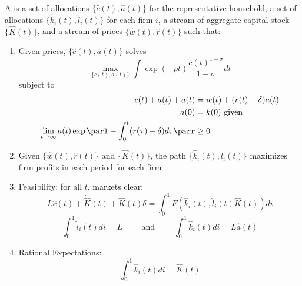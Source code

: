 \documentclass[10pt]{article}
\begin{document}
\begin{model}
	\begin{definition}
		A  is a set of allocations $\{\hat{c}(t),\hat{a}(t)\}$ for the representative household, a set of allocations $\{\hat{k}_i(t),\hat{l}_i(t)\}$ for each firm $i$, a stream of aggregate capital stock $\{\hat{K}(t)\}$, and a stream of prices $\{\hat{w}(t), \hat{r}(t)\}$ such that:
		\begin{enumerate}
			\item Given prices, $\{\hat{c}(t),\hat{a}(t)\}$ solves \[\max_{\{c(t),a(t)\}} \int \exp(-\rho t) \frac{c(t)^{1-\sigma}}{1-\sigma}dt \] subject to \begin{align*} c(t) + \dot{a}(t) + a(t) &= w(t) + (r(t)-\delta)a(t) \\ a(0) &= k(0) \text{ given} \\\lim_{t\to\infty} a(t)\exp \parl - \int_0^t (r(\tau)-\delta)d\tau\parr &\ge 0 \end{align*}
			\item Given $\{\hat{w}(t), \hat{r}(t)\}$ and $\{\hat{K}(t)\}$, the path $\{\hat{k}_i(t),\hat{l}_i(t)\}$ maximizes firm profits in each period for each firm
			\item Feasibility: for all $t$, markets clear: \[L\hat{c}(t) + \dot{\hat{K}}(t) + \hat{K}(t)\delta = \int_0^1 F(\hat{k}_i(t) , \hat{l}_i(t) \hat{K}(t)) di\]\[\int_0^1 \hat{l}_i(t)di = L \qquad \text{ and } \qquad \int_0^1 \hat{k}_i(t)di = L\hat{a}(t)\]
			\item Rational Expectations: \[\int_0^1 \hat{k}_i(t)di = \hat{K}(t)\]
		\end{enumerate}
	\end{definition}
	

\end{model}
\end{document}
